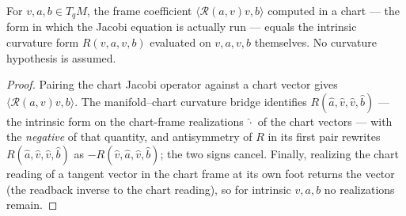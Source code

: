 \begin{lemma}
  \label{lem:dc-ch8-2-1-curvature-bridge}


  For $v,a,b\in T_qM$, the frame coefficient $\langle\mathcal R(a,v)v,b\rangle$ computed in a
  chart --- the form in which the Jacobi equation is actually run --- equals the intrinsic
  curvature form $R(v,a,v,b)$ evaluated on $v,a,v,b$ themselves. No curvature hypothesis is
  assumed.
\end{lemma}
\begin{proof}

\sketch
  Pairing the chart Jacobi operator against a chart vector gives
  $\langle\mathcal R(a,v)v,b\rangle$. The manifold--chart curvature bridge identifies
  $R(\hat a,\hat v,\hat v,\hat b)$ --- the intrinsic form on the chart-frame realizations
  $\hat\cdot$ of the chart vectors --- with the \emph{negative} of that quantity, and
  antisymmetry of $R$ in its first pair rewrites $R(\hat a,\hat v,\hat v,\hat b)$ as
  $-R(\hat v,\hat a,\hat v,\hat b)$; the two signs cancel. Finally, realizing the chart
  reading of a tangent vector in the chart frame at its own foot returns the vector
  (the readback inverse to the chart reading), so for intrinsic $v,a,b$ no realizations
  remain.
\end{proof}

